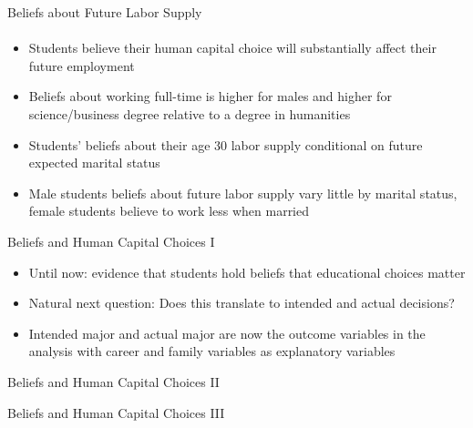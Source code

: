 \documentclass[12pt]{beamer}
\begin{document}
\begin{frame}{Beliefs about Future Labor Supply}
    \framesubtitle{} 
    \begin{itemize}
        \item Students believe their human capital choice will substantially affect their future employment
        \item Beliefs about working full-time is higher for males and higher for science/business degree relative to a degree in humanities
        \item Students' beliefs about their age 30 labor supply conditional on future expected marital status
        \item Male students beliefs about future labor supply vary little by marital status, female students believe to work less when married
    \end{itemize}
\end{frame}

\begin{frame}{Beliefs and Human Capital Choices I}
    \begin{itemize}
        \item Until now: evidence that students hold beliefs that educational choices matter
        \item Natural next question: Does this translate to intended and actual decisions?
        \item Intended major and actual major are now the outcome variables in the analysis with career and family variables as explanatory variables
    \end{itemize}  
\end{frame}

\begin{frame}{Beliefs and Human Capital Choices II}
     \begin{center}
    \end{center}
\end{frame}

\begin{frame}{Beliefs and Human Capital Choices III}
    \begin{center}
    \end{center}
\end{frame}
\end{document}
